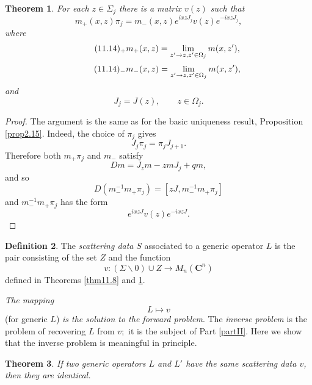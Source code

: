 \documentclass{surv-l}
\theoremstyle{plain}
\newtheorem{theorem}{Theorem}[section]
\theoremstyle{definition}
\newtheorem{definition}[theorem]{Definition}
\numberwithin{equation}{chapter}
\begin{document}
\begin{theorem}\label{thm11.12}
For each $z\in\Sigma_{j}$  there is a matrix $v(z)$  such that
\setcounter{equation}{12}
\begin{equation}\label{eq11.13}
m_{+}(x,z)\pi_{j}=m_{-}(x, z)e^{ixzJ_{j}}v(z)e^{-ixzJ_{j}},
\end{equation}
where
\begin{equation*}
\tag*{$(11.14)_{+}$} m_{+}(x,z) = \lim_{z'\rightarrow z,z'\in\Omega_{j}}m(x, z'),
\end{equation*}
\begin{equation*}
\tag*{$(11.14)_{-}$} m_{-}(x, z)=\lim_{z'\rightarrow z,z'\in\Omega_{j}}m(x,z'),
\end{equation*}
and
\setcounter{equation}{14}
\begin{equation}\label{eq11.15}
J_{j}=J(z),\qquad z\in\Omega_{j}.
\end{equation}
\end{theorem}

\begin{proof} The argument is the same as for the basic uniqueness result, Proposition \ref{prop2.15}. Indeed, the choice of $\pi_{j}$ gives
\begin{equation}\label{eq11.16}
J_{j}\pi_{j}=\pi_{j}J_{j+1}.
\end{equation}
Therefore both $m_{+}\pi_{j}$ and $m_{-}$ satisfy
\begin{equation*}
Dm=J_{z}m-zmJ_{j}+qm,
\end{equation*}
and so
\begin{equation*}
D(m_{-}^{-1}m_{+}\pi_{j})=[zJ, m_{-}^{-1}m_{+}\pi_{j}]
\end{equation*}
and $m_{-}^{-1}m_{+}\pi_{j}$ has the form
\begin{equation*}
e^{ixzJ}v(z)e^{-ixzJ}.
\end{equation*}
\end{proof}
\setcounter{theorem}{16}
\begin{definition}\label{defi11.17} The \emph{scattering data} $S$ associated to a generic operator $L$ is the pair consisting of the set $Z$ and the function
\begin{equation*}
v:(\Sigma\backslash 0)\cup Z\rightarrow M_{n}(\mathbf{C}^{n})
\end{equation*}
defined in Theorems \ref{thm11.8} and \ref{thm11.12}.

\emph{The mapping}
\begin{equation*}
L\mapsto v
\end{equation*}
(for generic $L$) \emph{is the solution to the forward problem}. The \emph{inverse problem} is the problem of recovering $L$ from $v;$ it is the subject of Part \ref{partII}. Here we show that the inverse problem is meaningful in principle.
\end{definition}
\setcounter{theorem}{17}
\begin{theorem}\label{thm11.18}
If two generic operators $L$ and $L'$ have the same scattering data $v$, then they are identical.
\end{theorem}
\end{document}
